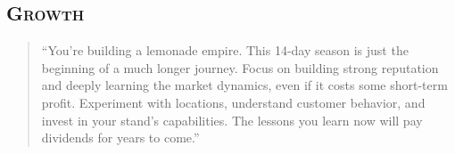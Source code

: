 \subsection{\textsc{Growth}}
\begin{quote}
\small
``You're building a lemonade empire. This 14-day season is just the beginning of a much longer journey. Focus on building strong reputation and deeply learning the market dynamics, even if it costs some short-term profit. Experiment with locations, understand customer behavior, and invest in your stand's capabilities. The lessons you learn now will pay dividends for years to come.''
\end{quote}



